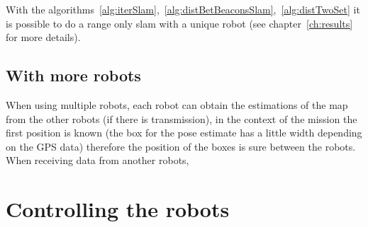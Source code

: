 With the algorithms~\ref{alg:iterSlam},~\ref{alg:distBetBeaconsSlam},~\ref{alg:distTwoSet} it is possible to do a range only slam with a unique robot (see chapter~\ref{ch:results} for more details).

\subsection{With more robots}

When using multiple robots, each robot can obtain the estimations of the map from the other robots (if there is transmission), in the context of the mission the first position is known (the box for the pose estimate has a little width depending on the GPS data) therefore the position of the boxes is sure between the robots. When receiving data from another robots, 

\section{Controlling the robots}